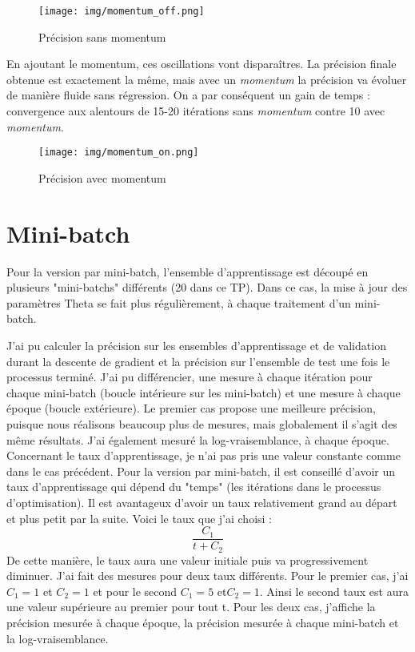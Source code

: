 \documentclass[12pt]{article}
\begin{document}
\begin{figure}[H]
\begin{center}
	\texttt{[image: img/momentum\_off.png]}
	\caption{Précision sans momentum}
\end{center}
\end{figure}

En ajoutant le momentum, ces oscillations vont disparaîtres. La précision finale obtenue est exactement la même, mais avec un \textit{momentum} la précision va évoluer de manière fluide sans régression. On a par conséquent un gain de temps : convergence aux alentours de 15-20 itérations sans \textit{momentum} contre 10 avec \textit{momentum}.
\begin{figure}[H]
\begin{center}
	\texttt{[image: img/momentum\_on.png]}
	\caption{Précision avec momentum}
\end{center}
\end{figure}


\section{Mini-batch}
Pour la version par mini-batch, l'ensemble d'apprentissage est découpé en plusieurs "mini-batchs" différents (20 dans ce TP). Dans ce cas, la mise à jour des paramètres Theta se fait plus régulièrement, à chaque traitement d'un mini-batch. 

J'ai pu calculer la précision sur les ensembles d'apprentissage et de validation durant la descente de gradient et la précision sur l'ensemble de test une fois le processus terminé. J'ai pu différencier, une mesure à chaque itération pour chaque mini-batch (boucle intérieure sur les mini-batch) et une mesure à chaque époque (boucle extérieure). Le premier cas propose une meilleure précision, puisque nous réalisons beaucoup plus de mesures, mais globalement il s'agit des même résultats.
J'ai également mesuré la log-vraisemblance, à chaque époque.\\

Concernant le taux d'apprentissage, je n'ai pas pris une valeur constante comme dans le cas précédent. Pour la version par mini-batch, il est conseillé d'avoir un taux d'apprentissage qui dépend du "temps" (les itérations dans le processus d'optimisation). Il est avantageux d'avoir un taux relativement grand au départ et plus petit par la suite. Voici le taux que j'ai choisi : 
\[\frac{C_1}{t+C_2}\]
De cette manière, le taux aura une valeur initiale puis va progressivement diminuer. J'ai fait des mesures pour deux taux différents. Pour le premier cas, j'ai $C_1 = 1$ et $C_2 = 1$ et pour le second $C_1 = 5$ et$ C_2 = 1$. Ainsi le second taux est aura une valeur supérieure au premier pour tout t.
Pour les deux cas, j'affiche la précision mesurée à chaque époque, la précision mesurée à chaque mini-batch et la log-vraisemblance.
\end{document}
